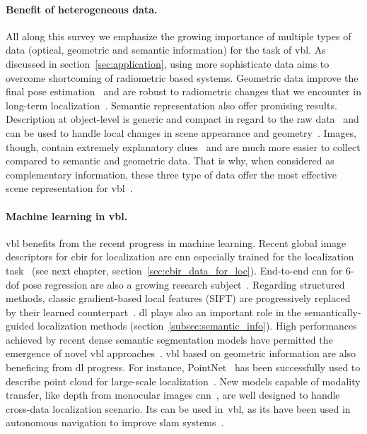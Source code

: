      	\paragraph{Benefit of heterogeneous data.}
	     	All along this survey we emphasize the growing importance of multiple types of data (optical, geometric and semantic information) for the task of \ac{vbl}. As discussed in section~\ref{sec:application}, using more sophisticate data aims to overcome shortcoming of radiometric based systems.
	     	Geometric data improve the final pose estimation~\citep{Pani2015Lmi,Pani2015Robust,Taira2018} and are robust to radiometric changes that we encounter in long-term localization~\citep{Uy2018}. Semantic representation also offer promising results. Description at object-level is generic and compact in regard to the raw data~\citep{Salas-Moreno2013} and can be used to handle local changes in scene appearance and geometry~\citep{Weinzaepfel2019}. Images, though, contain extremely explanatory clues~\citep{Arandjelovic2017} and are much more easier to collect compared to semantic and geometric data. That is why, when considered as complementary information, these three type of data offer the most effective scene representation for \ac{vbl}~\citep{Schonberger2017a}.	     		     	
     
		\paragraph{Machine learning in \ac{vbl}.}
			\ac{vbl} benefits from the recent progress in machine learning. Recent global image descriptors for \ac{cbir} for localization are \ac{cnn} especially trained for the localization task~\citep{Radenovic2017,Gordo2017,Noh2017} (see next chapter, section~\ref{sec:cbir_data_for_loc}). End-to-end \ac{cnn} for 6-\ac{dof} pose regression are also a growing research subject~\citep{Kendall2015,Kendall2016,Kendall2017,Walch2016a,Saha2018,Brahmbhatt2017a,Radwan2018}. Regarding structured methods, classic gradient-based local features (\eg SIFT) are progressively replaced by their learned counterpart~\citep{Sarlin2018a,Rocco2018}. \ac{dl} plays also an important role in the semantically-guided localization methods (section~\ref{subsec:semantic_info}). High performances achieved by recent dense semantic segmentation models have permitted the emergence of novel \ac{vbl} approaches~\citep{Toft2017,Toft2018,Naseer2017a,Shi2019,Schonberger2017a}. \ac{vbl} based on geometric information are also beneficing from \ac{dl} progress. For instance, PointNet~\citep{Qi2016a} has been successfully used to describe point cloud for large-scale localization~\citep{Uy2018}. New models capable of modality transfer, like depth from monocular images \ac{cnn}~\citep{Eigen2014}, are well designed to handle cross-data localization scenario. Its can be used in~\ac{vbl}, as its have been used in autonomous navigation to improve \ac{slam} systems~\citep{Tateno2017,Loo2019}.
			     
